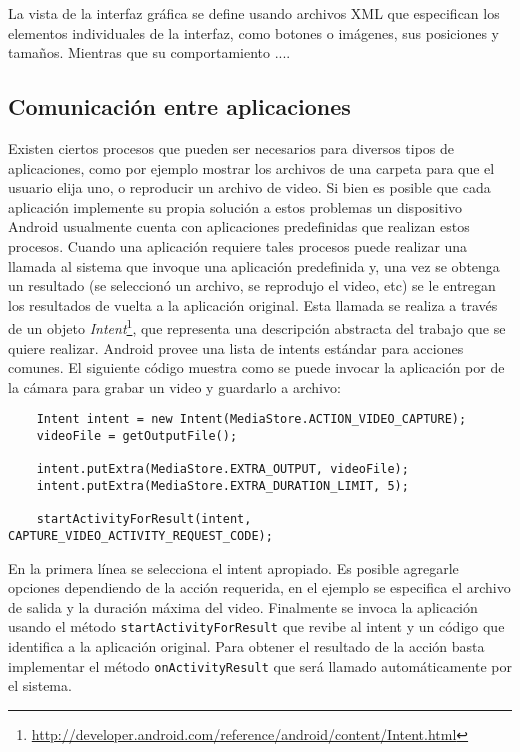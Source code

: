 La vista de la interfaz gráfica se define usando archivos XML que especifican los elementos individuales de la interfaz, como botones o imágenes, sus posiciones y tamaños. Mientras que su comportamiento ....
\subsection*{Comunicación entre aplicaciones}

Existen ciertos procesos que pueden ser necesarios para diversos tipos de aplicaciones, como por ejemplo mostrar los archivos de una carpeta para que el usuario elija uno, o reproducir un archivo de video. Si bien es posible que cada aplicación implemente su propia solución a estos problemas un dispositivo Android usualmente cuenta con aplicaciones predefinidas que realizan estos procesos. Cuando una aplicación requiere tales procesos puede realizar una llamada al sistema que invoque una aplicación predefinida y, una vez se obtenga un resultado (se seleccionó un archivo, se reprodujo el video, etc) se le entregan los resultados de vuelta a la aplicación original. Esta llamada se realiza a través de un objeto \emph{Intent}\footnote{\url{http://developer.android.com/reference/android/content/Intent.html}}, que representa una descripción abstracta del trabajo que se quiere realizar. Android provee una lista de intents estándar para acciones comunes. 
El siguiente código muestra como se puede invocar la aplicación por de la cámara para grabar un video y guardarlo a archivo:
\begin{lstlisting}
    Intent intent = new Intent(MediaStore.ACTION_VIDEO_CAPTURE);
    videoFile = getOutputFile();

    intent.putExtra(MediaStore.EXTRA_OUTPUT, videoFile);
    intent.putExtra(MediaStore.EXTRA_DURATION_LIMIT, 5);

    startActivityForResult(intent, CAPTURE_VIDEO_ACTIVITY_REQUEST_CODE);
\end{lstlisting}

En la primera línea se selecciona el intent apropiado. Es posible agregarle opciones dependiendo de la acción requerida, en el ejemplo se especifica el archivo de salida y la duración máxima del video. Finalmente se invoca la aplicación usando el método \texttt{startActivityForResult} que revibe al intent y un código que identifica a la aplicación original. Para obtener el resultado de la acción basta implementar el método \texttt{onActivityResult} que será llamado automáticamente por el sistema.  

